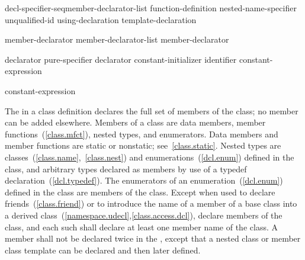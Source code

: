 \begin{bnf}
\br
    decl-specifier-seq\opt member-declarator-list\opt \terminal{;}\br
    function-definition \terminal{;\opt}\br
    \terminal{::}\opt nested-name-specifier \opt unqualified-id \terminal{;}\br
    using-declaration\br
    template-declaration
\end{bnf}

\begin{bnf}
\br
    member-declarator\br
    member-declarator-list \terminal{,} member-declarator
\end{bnf}

\begin{bnf}
\br
    declarator pure-specifier\opt\br
    declarator constant-initializer\opt\br
    identifier\opt \terminal{:} constant-expression
\end{bnf}

\begin{bnf}
\br
\end{bnf}

\begin{bnf}
\br
    \terminal{=} constant-expression
\end{bnf}

\pnum
{}%
The  in a class definition declares the
full set of members of the class; no member can be added elsewhere.
Members of a class are data members, member
functions~(\ref{class.mfct}), nested types, and enumerators. Data
members and member functions are static or nonstatic;
see~\ref{class.static}. Nested types are
classes~(\ref{class.name},~\ref{class.nest}) and
enumerations~(\ref{dcl.enum}) defined in the class, and arbitrary types
declared as members by use of a typedef declaration~(\ref{dcl.typedef}).
The enumerators of an enumeration~(\ref{dcl.enum}) defined in the class
are members of the class. Except when used to declare
friends~(\ref{class.friend}) or to introduce the name of a member of a
base class into a derived
class~(\ref{namespace.udecl},\ref{class.access.dcl}),
 declare members of the class, and each
such  shall declare at least one member
name of the class. A member shall not be declared twice in the
, except that a nested class or member
class template can be declared and then later defined.

